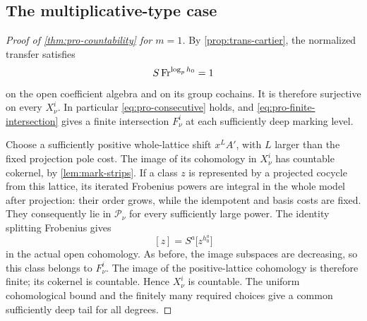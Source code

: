 \subsection{The multiplicative-type case}

\begin{proof}[Proof of \cref{thm:pro-countability} for $m=1$]
By \cref{prop:trans-cartier}, the normalized transfer satisfies
\[
 S\operatorname{Fr}^{\log_p h_0}=1
\]
on the open coefficient algebra and on its group cochains.
It is therefore surjective on every $X^i_\nu$.  In
particular \cref{eq:pro-consecutive} holds, and
\cref{eq:pro-finite-intersection} gives a finite intersection
$F^i_\nu$ at each sufficiently deep marking level.

Choose a sufficiently positive whole-lattice shift $x^LA'$,
with $L$ larger than the fixed projection pole cost.  The
image of its cohomology in $X^i_\nu$ has countable cokernel,
by \cref{lem:mark-strips}.  If a class $z$ is represented
by a projected cocycle from this lattice, its iterated
Frobenius powers are integral in the whole model after
projection: their order grows, while the idempotent and basis
costs are fixed.  They consequently lie in $\mathcal P_\nu$
for every sufficiently large power.  The identity splitting
Frobenius gives
\[
 [z]=S^a\bigl[z^{h_0^a}\bigr]
\]
in the actual open cohomology.  As before, the image
subspaces are decreasing, so this class belongs to
$F^i_\nu$.  The image of the positive-lattice cohomology is
therefore finite; its cokernel is countable.  Hence
$X^i_\nu$ is countable.  The uniform cohomological bound
and the finitely many required choices give a common
sufficiently deep tail for all degrees.
\end{proof}
